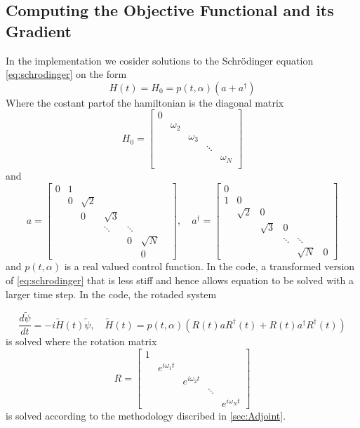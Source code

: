 \documentclass[11pt]{article}
\begin{document}
\subsection{Computing the Objective Functional and its Gradient}
In the implementation we cosider solutions to the Schr\"odinger equation \ref{eq:schrodinger} on the form
%
\[
H(t) = H_0 = p(t,\alpha)(a + a^\dagger)
\]
%
Where the costant partof the hamiltonian is the diagonal matrix 
\[
H_0 = 
\begin{bmatrix}
0 & & & & \\
& \omega_2 & & & \\
& & \omega_3 & & \\
& & & \ddots & \\
& & & & \omega_N \\
\end{bmatrix}
\]
%
and
%
\begin{equation*}\label{eq_matrices}
%
a = \begin{bmatrix}
0 & 1 & & & & &\\
 & 0 & \sqrt{2} & & & &\\
&  & 0 & \sqrt{3} & & &\\
& &  & \ddots & \ddots & &\\
& & & &  0 & \sqrt{N} & \\
& & & & & 0&
\end{bmatrix},\quad
%
a^\dag = \begin{bmatrix}
0 &  & &  &\\
1 & 0 & & & &\\
&  \sqrt{2} & 0 &  & &\\
& &  \sqrt{3} & 0 & &\\
& &  & \ddots & \ddots & \\
& & & & \sqrt{N} & 0
\end{bmatrix}
\end{equation*}
%
and $p(t,\alpha)$ is a real valued control function. In the code, a transformed version of \eqref{eq:schrodinger} that is less stiff and hence allows equation to be solved with a larger time step. In the code, the rotaded system

\begin{equation}\label{eq:rotschroedinger}
\frac{d\tilde{\psi}}{dt} = - i \tilde{H}(t)\tilde{\psi}, \quad \tilde{H}(t) =  p(t,\alpha)(R(t)aR^\dag(t) + R(t)a^\dag R^\dag(t))
\end{equation}
is solved where the rotation matrix
\\
\[
R = 
\begin{bmatrix}
 1 & & & & \\ 
 & e^{i \omega_1 t} & & &\\
 & & e^{i \omega_2 t} & &\\
 & & &\ddots &  \\
 & & & & e^{i \omega_N t}
\end{bmatrix}
\]
is solved according to the methodology discribed in \ref{sec:Adjoint}.
\end{document}
